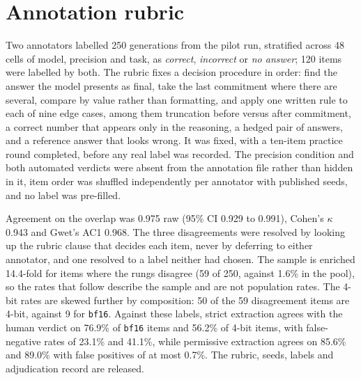 \documentclass[conference]{IEEEtran}
\begin{document}
\section{Annotation rubric}
\label{app:rubric}

%

Two annotators labelled 250 generations from the pilot run, stratified across 48 cells of
model, precision and task, as \emph{correct}, \emph{incorrect} or \emph{no answer}; 120
items were labelled by both. The rubric fixes a decision procedure in order: find the answer
the model presents as final, take the last commitment where there are several, compare by
value rather than formatting, and apply one written rule to each of nine edge cases, among
them truncation before versus after commitment, a correct number that appears only in the
reasoning, a hedged pair of answers, and a reference answer that looks wrong. It was fixed,
with a ten-item practice round completed, before any real label was recorded. The precision
condition and both automated verdicts were absent from the annotation file rather than
hidden in it, item order was shuffled independently per annotator with published seeds, and
no label was pre-filled.

Agreement on the overlap was 0.975 raw (95\% CI 0.929 to 0.991), Cohen's $\kappa$ 0.943
and Gwet's AC1 0.968. The three disagreements were resolved by looking up the rubric clause
that decides each item, never by deferring to either annotator, and one resolved to a label
neither had chosen. The sample is enriched 14.4-fold for items where the rungs disagree (59 of 250, against
1.6\% in the pool), so the rates that follow describe the sample and are not population
rates. The 4-bit rates are skewed further by composition: 50 of the 59 disagreement items
are 4-bit, against 9 for \texttt{bf16}. Against these labels, strict extraction agrees with the human verdict on
76.9\% of \texttt{bf16} items and 56.2\% of 4-bit items, with false-negative rates of
23.1\% and 41.1\%, while permissive extraction agrees on 85.6\% and 89.0\% with false
positives of at most 0.7\%. The rubric, seeds, labels and adjudication record are released.
\end{document}
